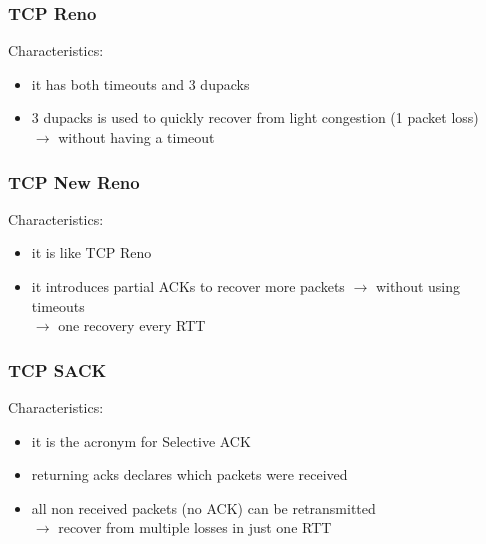 \subsubsection{TCP Reno}
Characteristics:
\begin{itemize}
    \item it has both timeouts and 3 dupacks
    \item 3 dupacks is used to quickly recover from light congestion (1 packet loss)\\
    $\rightarrow$ without having a timeout
\end{itemize}
\subsubsection{TCP New Reno}
Characteristics:
\begin{itemize}
    \item it is like TCP Reno
    \item it introduces partial ACKs to recover more packets $\rightarrow$ without using timeouts\\
    $\rightarrow$ one recovery every RTT
\end{itemize}
\subsubsection{TCP SACK}
Characteristics:
\begin{itemize}
    \item it is the acronym for Selective ACK
    \item returning acks declares which packets were received
    \item all non received packets (no ACK) can be retransmitted\\
    $\rightarrow$ recover from multiple losses in just one RTT
\end{itemize}
